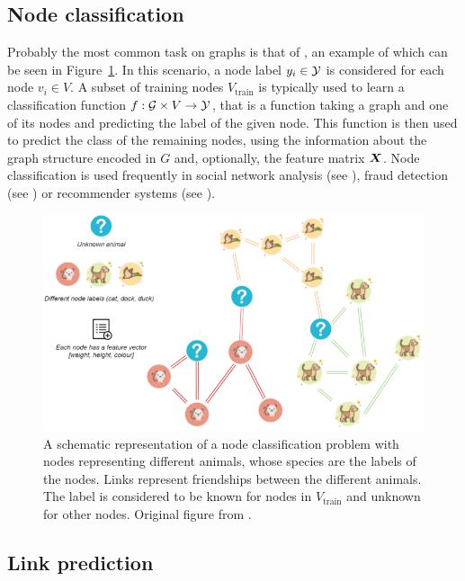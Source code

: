 \subsection{Node classification}

Probably the most common task on graphs is that of , an example of which can be seen in Figure~\ref{fig:node-classification}. In this scenario, a node label \( y_i \in \mathcal{Y} \) is considered for each node \( v_i \in V \). A subset of training nodes \( V_\mathrm{train} \) is typically used to learn a classification function \( f : \mathcal{G} \times V \to \mathcal{Y} \), that is a function taking a graph and one of its nodes and predicting the label of the given node. This function is then used to predict the class of the remaining nodes, using the information about the graph structure encoded in \( G \) and, optionally, the feature matrix \( \bm{X} \). Node classification is used frequently in social network analysis (see \cite{perozzi_deepwalk_2014}), fraud detection (see \cite{akoglu_graph_2015}) or recommender systems (see \cite{berg_graph_2017}).

\begin{figure}
	\includegraphics[width=\linewidth]{images/graph-tasks/node-classification.png}
	\caption{A schematic representation of a node classification problem with nodes representing different animals, whose species are the labels of the nodes. Links represent friendships between the different animals. The label is considered to be known for nodes in \( V_\mathrm{train} \) and unknown for other nodes. Original figure from \cite{kubara_machine_2020}.}
	\label{fig:node-classification}
\end{figure}

\subsection{Link prediction}


